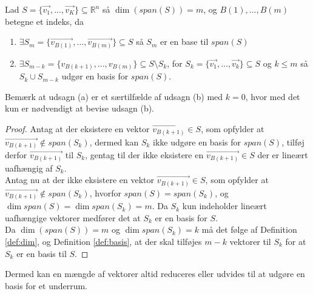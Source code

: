 \begin{stn}
Lad $S=\{\vec{v_1},..., \vec{v_K}\} \subseteq \mathds{R}^n$ så $\dim(span(S)) = m$, og $B(1),...,B(m)$ betegne et indeks, da
\begin{enumerate}[label=\alph*]
\item $\exists S_m =\{\vec{v_{B(1)}},...,\vec{v_{B(m)}}\}\subseteq S$ så $S_m$ er en base til $span (S)$
\item $\exists S_{m-k} = \{v_{B(k+1)},...,v_{B(m)}\} \subseteq S\setminus S_k$, for $S_k = \{\vec{v_1},..., \vec{v_k}\} \subseteq S$ og $k \leq m$ så $S_k \cup S_{m-k}$ udgør en basis for $span(S)$.
\end{enumerate} 
\label{stn:spantilbasis}
\end{stn}
Bemærk at udsagn (a) er et særtilfælde af udsagn (b) med $k=0$, hvor med det kun er nødvendigt at bevise udsagn (b).
\begin{proof}
Antag at der eksistere en vektor $\vec{v_{B(k+1)}} \in S$, som opfylder at $\vec{v_{B(k+1)}} \notin span(S_k)$, dermed kan $S_k$ ikke udgøre en basis for $span(S)$, tilføj derfor $\vec{v_{B(k+1)}}$ til $S_k$, gentag til der ikke eksistere en $\vec{v_{B(k+1)}} \in S$ der er lineært uafhængig af $S_k$. 
\\Antag nu at der ikke eksistere en vektor $\vec{v_{B(k+1)}} \in S$, som opfylder at $\vec{v_{B(k+1)}} \notin span(S_k)$, hvorfor $span(S) = span(S_k)$, og $\dim{span(S)}=\dim{span(S_k)}= m$.
Da $S_k$ kun indeholder lineært uafhængige vektorer medfører det at $S_k$ er en basis for $S$.
\\Da $\dim(span(S)) = m$ og $\dim{span(S_k)}=k$ må det følge af Definition \ref{def:dim}, og Definition \ref{def:basis}, at der skal tilføjes $m-k$ vektorer til $S_k$ for at $S_k$ er en basis til $S$.
%
%
%
\end{proof} 
Dermed kan en mængde af vektorer altid reduceres eller udvides til at udgøre en basis for et underrum.


